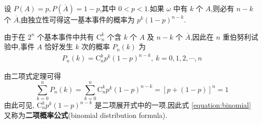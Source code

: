 设 $P(A)=p, P(\overline{A}) = 1-p$,其中 $0<p<1$.如果 $\omega$ 中有 $k$ 个 $A$,则必有 $n-k$ 个 $\overline{A}$,由独立性可得这一基本事件的概率为 $p^k (1-p)^{n-k}$.

由于在 $2^n$ 个基本事件中共有 $\mathrm{C}_n^k$ 个含 $k$ 个 $A$ 及 $n-k$ 个 $\overline{A}$,因此在 $n$ 重伯努利试验中,事件 $A$ 恰好发生 $k$ 次的概率 $P_n(k)$ 为
\begin{gather} \label{equation:binomial}
    P_n(k)=\mathrm{C}_n^k p^k (1-p)^{n-k}, \ k=0,1,2,\cdots,n
\end{gather}

由二项式定理可得
$$
\sum_{k=0}^n P_n(k) = \sum_{k=0}^n \mathrm{C}_n^k p^k (1-p)^{n-k} = [p+(1-p)]^n = 1
$$
由此可见, $\mathrm{C}_n^k p^k (1-p)^{n-k}$ 是二项展开式中的一项,因此式 \eqref{equation:binomial} 又称为\textbf{二项概率公式}(binomial distribution formula).